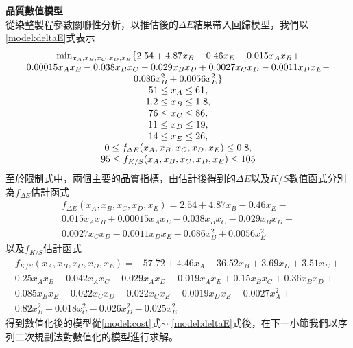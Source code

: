 \textbf{品質數值模型}\\
從染整製程參數關聯性分析，以推估後的$\Delta E$結果帶入回歸模型，我們以\ref{model:deltaE}式表示
\begin{equation}
	\begin{array}{c}
	\min_{x_A,x_B,x_C,x_D,x_E} \{ 2.54 + 4.87x_B - 0.46x_E - 0.015x_Ax_B + \\ 
	0.00015x_Ax_E - 0.038x_Bx_C - 0.029x_Bx_D + 0.0027x_Cx_D - 0.0011x_Dx_E - \\
	0.086x_B^2 + 0.0056x_E^2 \} \\
	51 \leq x_A \leq 61,\\
	1.2 \leq x_B \leq 1.8,\\
	76 \leq x_C \leq 86,\\
	11 \leq x_D \leq 19,\\
	14 \leq x_E \leq 26,\\
	0 \leq f_{\Delta E}(x_A,x_B,x_C,x_D,x_E) \leq 0.8,\\
	95 \leq f_{K/S}(x_A,x_B,x_C,x_D,x_E) \leq 105
	\end{array}
	\label{model:deltaE}
	\hfill
\end{equation}
至於限制式中，兩個主要的品質指標，由估計後得到的$\Delta E$以及$K/S$數值函式分別為$f_{\Delta E}$估計函式
\begin{equation*}
	\begin{split}
	f_{\Delta E}(x_A,x_B,x_C,x_D,x_E)=2.54 + 4.87x_B - 0.46x_E - \\
	0.015x_Ax_B + 0.00015x_Ax_E - 0.038x_Bx_C - 0.029x_Bx_D + \\
	0.0027x_Cx_D - 0.0011x_Dx_E - 0.086x_B^2 + 0.0056x_E^2 
	\end{split}
\end{equation*}
以及$f_{K/S}$估計函式
\begin{equation*}
	\begin{array}{c}
	f_{K/S}(x_A,x_B,x_C,x_D,x_E)=-57.72+4.46x_A-36.52x_B+3.69x_D+3.51x_E+\\
	0.25x_Ax_B-0.042x_Ax_C-0.029x_Ax_D-0.019x_Ax_E+
	0.15x_Bx_C+0.36x_Bx_D+\\
	0.085x_Bx_E-0.022x_Cx_D-0.022x_Cx_E-0.0019x_Dx_E-0.0027x_A^2+\\
	0.82x_B^2+0.018x_C^2-0.026x_D^2-0.025x_E^2 
	\end{array}
\end{equation*}
得到數值化後的模型從\ref{model:cost}式$\sim$ \ref{model:deltaE}式後，在下一小節我們以序列二次規劃法對數值化的模型進行求解。